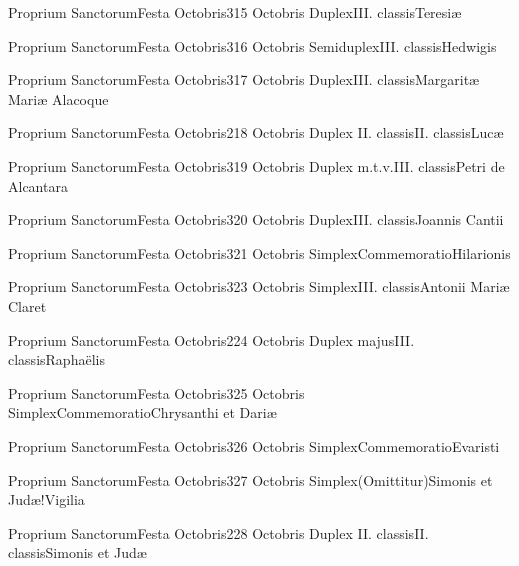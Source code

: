 \documentclass[psalterium-feriale.tex]{subfiles}
\begin{document}
	{Proprium Sanctorum}{Festa Octobris}{3}{15 Octobris}
	{Duplex}{III. classis}{Teresiæ}
	{}
	{}

	{Proprium Sanctorum}{Festa Octobris}{3}{16 Octobris}
	{Semiduplex}{III. classis}{Hedwigis}
	{}
	{}

	{Proprium Sanctorum}{Festa Octobris}{3}{17 Octobris}
	{Duplex}{III. classis}{Margaritæ Mariæ Alacoque}
	{}
	{}

	{Proprium Sanctorum}{Festa Octobris}{2}{18 Octobris}
	{Duplex II. classis}{II. classis}{Lucæ}
	{}
	{}
\psalmodiapropria

	{Proprium Sanctorum}{Festa Octobris}{3}{19 Octobris}
	{Duplex m.t.v.}{III. classis}{Petri de Alcantara}
	{}
	{}

	{Proprium Sanctorum}{Festa Octobris}{3}{20 Octobris}
	{Duplex}{III. classis}{Joannis Cantii}
	{}
	{}

	{Proprium Sanctorum}{Festa Octobris}{3}{21 Octobris}
	{Simplex}{Commemoratio}{Hilarionis}
	{}
	{}

	{Proprium Sanctorum}{Festa Octobris}{3}{23 Octobris}
	{Simplex}{III. classis}{Antonii Mariæ Claret}
	{}
	{}

	{Proprium Sanctorum}{Festa Octobris}{2}{24 Octobris}
	{Duplex majus}{III. classis}{Raphaëlis}
	{}
	{}
\psalmodiapropria

	{Proprium Sanctorum}{Festa Octobris}{3}{25 Octobris}
	{Simplex}{Commemoratio}{Chrysanthi et Dariæ}
	{}
	{}

	{Proprium Sanctorum}{Festa Octobris}{3}{26 Octobris}
	{Simplex}{Commemoratio}{Evaristi}
	{}
	{}

	{Proprium Sanctorum}{Festa Octobris}{3}{27 Octobris}
	{Simplex}{(Omittitur)}{Simonis et Judæ!Vigilia}
	{}
	{}
\invitferia

	{Proprium Sanctorum}{Festa Octobris}{2}{28 Octobris}
	{Duplex II. classis}{II. classis}{Simonis et Judæ}
	{}
	{}
\psalmodiapropria
\end{document}
